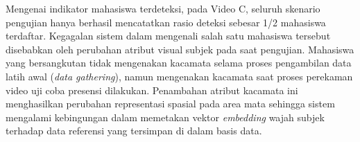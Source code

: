 Mengenai indikator mahasiswa terdeteksi, pada Video C, seluruh skenario pengujian hanya berhasil mencatatkan rasio deteksi sebesar 1/2 mahasiswa terdaftar. Kegagalan sistem dalam mengenali salah satu mahasiswa tersebut disebabkan oleh perubahan atribut visual subjek pada saat pengujian. Mahasiswa yang bersangkutan tidak mengenakan kacamata selama proses pengambilan data latih awal (\textit{data gathering}), namun mengenakan kacamata saat proses perekaman video uji coba presensi dilakukan. Penambahan atribut kacamata ini menghasilkan perubahan representasi spasial pada area mata sehingga sistem mengalami kebingungan dalam memetakan vektor \textit{embedding} wajah subjek terhadap data referensi yang tersimpan di dalam basis data.




